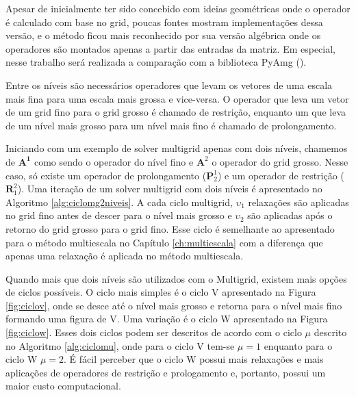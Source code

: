 Apesar de inicialmente ter sido concebido com ideias geométricas onde o operador é calculado com base no grid, poucas fontes mostram implementações dessa versão, e o método ficou mais reconhecido por sua versão algébrica onde os operadores são montados apenas a partir das entradas da matriz. Em especial, nesse trabalho será realizada a comparação com a biblioteca PyAmg (\citet{OlSc2018}).


Entre os níveis são necessários operadores que levam os vetores de uma escala mais fina para uma escala mais grossa e vice-versa. O operador que leva um vetor de um grid fino para o grid grosso é chamado de restrição, enquanto um que leva de um nível mais grosso para um nível mais fino é chamado de prolongamento. 


Iniciando com um exemplo de solver multigrid apenas com dois níveis, chamemos de $\mathbf{A^1}$ como sendo o operador do nível fino e $\mathbf{A}^2$ o operador do grid grosso. Nesse caso, só existe um operador de prolongamento ($\mathbf{P}_2^1$) e um operador de restrição ($\mathbf{R}^2_1$). Uma iteração de um solver multigrid com dois níveis é apresentado no Algoritmo \ref{alg:ciclomg2niveis}. A cada ciclo multigrid, $\upsilon_1$ relaxações são aplicadas no grid fino antes de descer para o nível mais grosso e $\upsilon_2$ são aplicadas após o retorno do grid grosso para o grid fino. Esse ciclo é semelhante ao apresentado para o método multiescala no Capítulo \ref{ch:multiescala} com a diferença que apenas uma relaxação é aplicada no método multiescala.


Quando mais que dois níveis são utilizados com o Multigrid, existem mais opções de ciclos possíveis. O ciclo mais simples é o ciclo V apresentado na Figura \ref{fig:ciclov}, onde se desce até o nível mais grosso e retorna para o nível mais fino formando uma figura de V. Uma variação é o ciclo W apresentado na Figura \ref{fig:ciclow}. Esses dois ciclos podem ser descritos de acordo com o ciclo $\mu$ descrito no Algoritmo \ref{alg:ciclomu}, onde para o ciclo V tem-se $\mu = 1$ enquanto para o ciclo W $\mu = 2$. É fácil perceber que o ciclo W possui mais relaxações e mais aplicações de operadores de restrição e prologamento e, portanto, possui um maior custo computacional.

